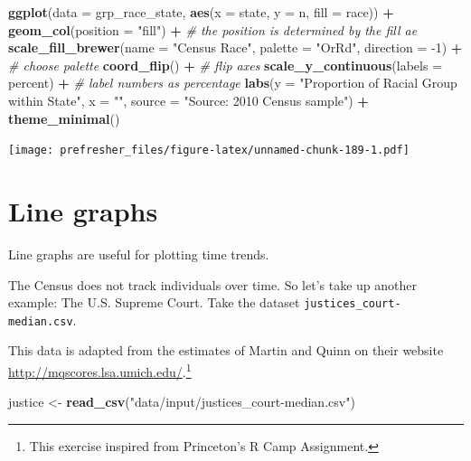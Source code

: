 \documentclass[]{book}
\newenvironment{Shaded}{\begin{snugshade}}{\end{snugshade}}
\newcommand{\CommentTok}[1]{\textcolor[rgb]{0.56,0.35,0.01}{\textit{#1}}}
\newcommand{\DataTypeTok}[1]{\textcolor[rgb]{0.13,0.29,0.53}{#1}}
\newcommand{\DecValTok}[1]{\textcolor[rgb]{0.00,0.00,0.81}{#1}}
\newcommand{\KeywordTok}[1]{\textcolor[rgb]{0.13,0.29,0.53}{\textbf{#1}}}
\newcommand{\NormalTok}[1]{#1}
\newcommand{\OperatorTok}[1]{\textcolor[rgb]{0.81,0.36,0.00}{\textbf{#1}}}
\newcommand{\StringTok}[1]{\textcolor[rgb]{0.31,0.60,0.02}{#1}}
\let\rmarkdownfootnote\footnote%
\def\footnote{\protect\rmarkdownfootnote}
\theoremstyle{definition}
\theoremstyle{definition}
\theoremstyle{definition}
\theoremstyle{remark}
\begin{document}
\begin{Shaded}
\begin{Highlighting}[]
\KeywordTok{ggplot}\NormalTok{(}\DataTypeTok{data =}\NormalTok{ grp_race_state, }\KeywordTok{aes}\NormalTok{(}\DataTypeTok{x =}\NormalTok{  state, }\DataTypeTok{y =}\NormalTok{ n,  }\DataTypeTok{fill =}\NormalTok{ race)) }\OperatorTok{+}
\StringTok{  }\KeywordTok{geom_col}\NormalTok{(}\DataTypeTok{position =} \StringTok{"fill"}\NormalTok{) }\OperatorTok{+}\StringTok{ }\CommentTok{# the position is determined by the fill ae}
\StringTok{  }\KeywordTok{scale_fill_brewer}\NormalTok{(}\DataTypeTok{name =} \StringTok{"Census Race"}\NormalTok{, }\DataTypeTok{palette =} \StringTok{"OrRd"}\NormalTok{, }\DataTypeTok{direction =} \DecValTok{-1}\NormalTok{) }\OperatorTok{+}\StringTok{ }\CommentTok{# choose palette}
\StringTok{  }\KeywordTok{coord_flip}\NormalTok{() }\OperatorTok{+}\StringTok{ }\CommentTok{# flip axes}
\StringTok{  }\KeywordTok{scale_y_continuous}\NormalTok{(}\DataTypeTok{labels =}\NormalTok{ percent) }\OperatorTok{+}\StringTok{ }\CommentTok{# label numbers as percentage}
\StringTok{  }\KeywordTok{labs}\NormalTok{(}\DataTypeTok{y =} \StringTok{"Proportion of Racial Group within State"}\NormalTok{,}
       \DataTypeTok{x =} \StringTok{""}\NormalTok{,}
       \DataTypeTok{source =} \StringTok{"Source: 2010 Census  sample"}\NormalTok{) }\OperatorTok{+}
\StringTok{  }\KeywordTok{theme_minimal}\NormalTok{()}
\end{Highlighting}
\end{Shaded}

\texttt{[image: prefresher\_files/figure-latex/unnamed-chunk-189-1.pdf]}

\hypertarget{line-graphs}{%
\section{Line graphs}\label{line-graphs}}

Line graphs are useful for plotting time trends.

The Census does not track individuals over time. So let's take up another example: The U.S. Supreme Court. Take the dataset \texttt{justices\_court-median.csv}.

This data is adapted from the estimates of Martin and Quinn on their website \url{http://mqscores.lsa.umich.edu/}.\footnote{This exercise inspired from Princeton's R Camp Assignment.}

\begin{Shaded}
\begin{Highlighting}[]
\NormalTok{justice <-}\StringTok{ }\KeywordTok{read_csv}\NormalTok{(}\StringTok{"data/input/justices_court-median.csv"}\NormalTok{)}
\end{Highlighting}
\end{Shaded}
\end{document}
